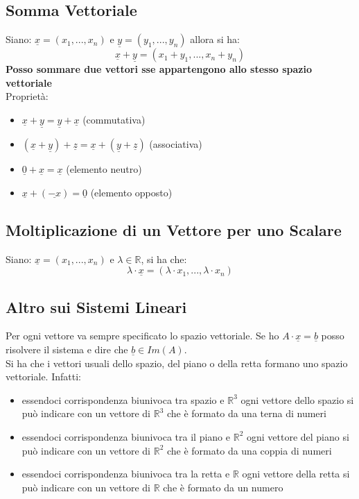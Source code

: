 \documentclass[a4paper,12pt, oneside]{book}
\begin{document}
\subsection{Somma Vettoriale}
Siano: $\underline{x}=(x_1,...,x_n)$ e $\underline{y}=(y_1,...,y_n)$ allora si ha:
$$\underline{x}+\underline{y}=(x_1+y_1,...,x_n+y_n)$$
\textbf{Posso sommare due vettori sse appartengono allo stesso spazio vettoriale}\\
Proprietà:
\begin{itemize}
	\item $\underline{x}+\underline{y}=\underline{y}+\underline{x}$ (commutativa)
	\item $(\underline{x}+\underline{y})+\underline{z}=\underline{x}+(\underline{y}+\underline{z})$ (associativa)
	\item $\underline{0}+\underline{x}=\underline{x}$ (elemento neutro)
	\item $\underline{x}+(\underline{-x})=\underline{0}$ (elemento opposto)
\end{itemize}
\subsection{Moltiplicazione di un Vettore per uno Scalare}
Siano: $\underline{x}=(x_1,...,x_n)$ e $\lambda\in\mathbb{R}$, si ha che:
$$\lambda\cdot\underline{x}=(\lambda\cdot x_1,...,\lambda\cdot x_n)$$
\subsection{Altro sui Sistemi Lineari}
Per ogni vettore va sempre specificato lo spazio vettoriale. Se ho $A\cdot \underline{x}=\underline{b}$ posso risolvere il sistema e dire che $\underline{b}\in Im(A)$.\\
Si ha che i vettori usuali dello spazio, del piano o della retta formano uno spazio vettoriale. Infatti:
\begin{itemize}
	\item essendoci corrispondenza biunivoca tra spazio e $\mathbb{R}^3$ ogni vettore dello spazio si può indicare con un vettore di $\mathbb{R}^3$ che è formato da una terna di numeri
	\item essendoci corrispondenza biunivoca tra il piano e $\mathbb{R}^2$ ogni vettore del piano si può indicare con un vettore di $\mathbb{R}^2$ che è formato da una coppia di numeri
	\item essendoci corrispondenza biunivoca tra la retta e $\mathbb{R}$ ogni vettore della retta si può indicare con un vettore di $\mathbb{R}$ che è formato da un numero
\end{itemize}
\end{document}
